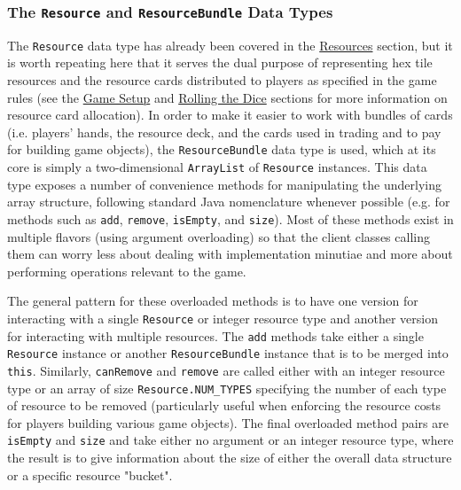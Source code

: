 \documentclass[pageno]{jpaper}
\begin{document}
\begin{doublespacing}
\subsubsection{The \lstinline$Resource$ and \lstinline$ResourceBundle$ Data Types}

The \lstinline$Resource$ data type has already been covered in the \hyperlink{sec:resources}{Resources} section, but it is worth repeating here that it serves the dual purpose of representing hex tile resources and the resource cards distributed to players as specified in the game rules (see the \hyperlink{sec:game_setup}{Game Setup} and \hyperlink{sec:rolling_the_dice}{Rolling the Dice} sections for more information on resource card allocation). In order to make it easier to work with bundles of cards (i.e. players' hands, the resource deck, and the cards used in trading and to pay for building game objects), the \lstinline$ResourceBundle$ data type is used, which at its core is simply a two-dimensional \lstinline$ArrayList$ of \lstinline$Resource$ instances. This data type exposes a number of convenience methods for manipulating the underlying array structure, following standard Java nomenclature whenever possible (e.g. for methods such as \lstinline$add$, \lstinline$remove$, \lstinline$isEmpty$, and \lstinline$size$). Most of these methods exist in multiple flavors (using argument overloading) so that the client classes calling them can worry less about dealing with implementation minutiae and more about performing operations relevant to the game. 

The general pattern for these overloaded methods is to have one version for interacting with a single \lstinline$Resource$ or integer resource type and another version for interacting with multiple resources. The \lstinline$add$ methods take either a single \lstinline$Resource$ instance or another \lstinline$ResourceBundle$ instance that is to be merged into \lstinline$this$. Similarly, \lstinline$canRemove$ and \lstinline$remove$ are called either with an integer resource type or an array of size \lstinline$Resource.NUM_TYPES$ specifying the number of each type of resource to be removed (particularly useful when enforcing the resource costs for players building various game objects). The final overloaded method pairs are \lstinline$isEmpty$ and \lstinline$size$ and take either no argument or an integer resource type, where the result is to give information about the size of either the overall data structure or a specific resource "bucket". 


\end{doublespacing}
\end{document}
